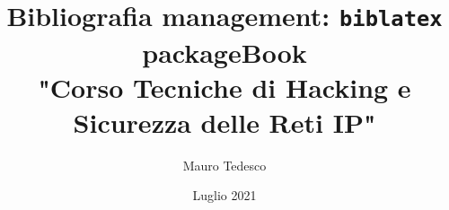 \documentclass[a4paper,12pt]{book}
\title{Bibliografia management: \texttt{biblatex} package}
\begin{document}
	

\renewcommand{\chaptermark}[1]{ \markboth{#1}{} }
\renewcommand{\sectionmark}[1]{ \markright{#1}{} }

\renewcommand{\headrulewidth}{0.5pt}
\renewcommand{\footrulewidth}{1pt}




\author{Mauro Tedesco}
\title{Book \\
	"Corso Tecniche di Hacking e Sicurezza delle
	Reti IP"}
\date{Luglio 2021}



\frontmatter
\maketitle
\tableofcontents

\mainmatter



















\backmatter


\printindex

\printbibliography
\end{document}
